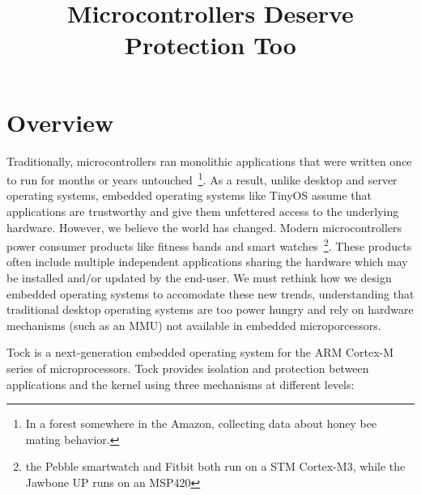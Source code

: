 \documentclass{article}
\title{Microcontrollers Deserve Protection Too}
\author{}
\date{}
\begin{document}
  \maketitle

  \section{Overview}

  Traditionally, microcontrollers ran monolithic applications that were written
  once to run for months or years untouched~\footnote{In a forest somewhere in
  the Amazon, collecting data about honey bee mating behavior.}. As a result,
  unlike desktop and server operating systems, embedded operating systems like
  TinyOS assume that applications are trustworthy and give them unfettered
  access to the underlying hardware. However, we believe the world has changed.
  Modern microcontrollers power consumer products like fitness bands and smart
  watches~\footnote{the Pebble smartwatch and Fitbit both run on a STM
  Cortex-M3, while the Jawbone UP runs on an MSP420}. These products often
  include multiple independent applications sharing the hardware which may be
  installed and/or updated by the end-user. We must rethink how we design
  embedded operating systems to accomodate these new trends, understanding that
  traditional desktop operating systems are too power hungry and rely on
  hardware mechanisms (such as an MMU) not available in embedded
  microporcessors.

  Tock is a next-generation embedded operating system for the ARM Cortex-M
  series of microprocessors. Tock provides isolation and protection between
  applications and the kernel using three mechanisms at different levels:
\end{document}
